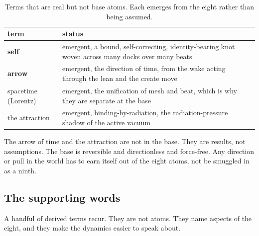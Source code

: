 \begin{table}[ht]
\centering
\begin{tabular}{@{}ll@{}}
\toprule
term & status \\
\midrule
\textbf{self} & emergent, a bound, self-correcting, identity-bearing knot woven across many docks over many beats \\
\textbf{arrow} & emergent, the direction of time, from the wake acting through the lean and the create move \\
spacetime (Lorentz) & emergent, the unification of mesh and beat, which is why they are separate at the base \\
the attraction & emergent, binding-by-radiation, the radiation-pressure shadow of the active vacuum \\
\bottomrule
\end{tabular}
\caption{Terms that are real but not base atoms. Each emerges from the eight rather than being assumed.}
\label{tab:emergent}
\end{table}

\begin{principle}
The arrow of time and the attraction are not in the base. They are results, not assumptions. The base is reversible and directionless and force-free. Any direction or pull in the world has to earn itself out of the eight atoms, not be smuggled in as a ninth.
\end{principle}

\subsection{The supporting words}

A handful of derived terms recur. They are not atoms. They name aspects of the eight, and they make the dynamics easier to speak about.

